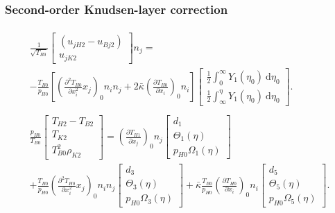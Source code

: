 \documentclass[mathserif]{beamer} %
\newcommand{\dd}{\:\mathrm{d}}
\newcommand{\pder}[2][]{\frac{\partial#1}{\partial#2}}
\newcommand{\pderder}[2][]{\frac{\partial^2 #1}{\partial #2^2}}
\newcommand{\onwall}[1]{\left(#1\right)_0}
\begin{document}
\begin{frame}
    \frametitle{Second-order Knudsen-layer correction}
    \footnotesize
    \begin{gather}
        \begin{multlined}
            \frac1{\sqrt{T_{B0}}}
                \begin{bmatrix} (u_{jH2} - u_{Bj2}) \\ u_{jK2} \end{bmatrix} n_j = \\
            - \frac{T_{B0}}{p_{H0}}\left[ \onwall{\pderder[T_{H0}]{x_i}{x_j}}n_i n_j
                + 2\bar\kappa\onwall{\pder[T_{H0}]{x_i}}n_i \right]
                \begin{bmatrix} \frac12\int_0^\infty Y_1(\eta_0)\dd\eta_0 \\
                    \frac12\int_\infty^{\eta} Y_1(\eta_0)\dd\eta_0 \end{bmatrix}.
        \end{multlined}\label{eq:boundary_u2n}\\
        \begin{multlined}
            \frac{p_{H0}}{T_{B0}}
                \begin{bmatrix} T_{H2} - T_{B2} \\ T_{K2} \\ T_{B0}^2\rho_{K2} \end{bmatrix} =
            \onwall{\pder[T_{H1}]{x_j}} n_j
                \begin{bmatrix} d_1 \\ \Theta_1(\eta) \\ p_{H0}\Omega_1(\eta) \end{bmatrix} \\
            + \frac{T_{B0}}{p_{H0}}\onwall{\pderder[T_{H0}]{x_i}{x_j}} n_i n_j
                \begin{bmatrix} d_3 \\ \Theta_3(\eta) \\ p_{H0}\Omega_3(\eta) \end{bmatrix}
            + \bar\kappa\frac{T_{B0}}{p_{H0}}\onwall{\pder[T_{H0}]{x_i}} n_i
                \begin{bmatrix} d_5 \\ \Theta_5(\eta) \\ p_{H0}\Omega_5(\eta) \end{bmatrix}.
        \end{multlined}\label{eq:boundary_T2}
    \end{gather}
\end{frame}
\end{document}
